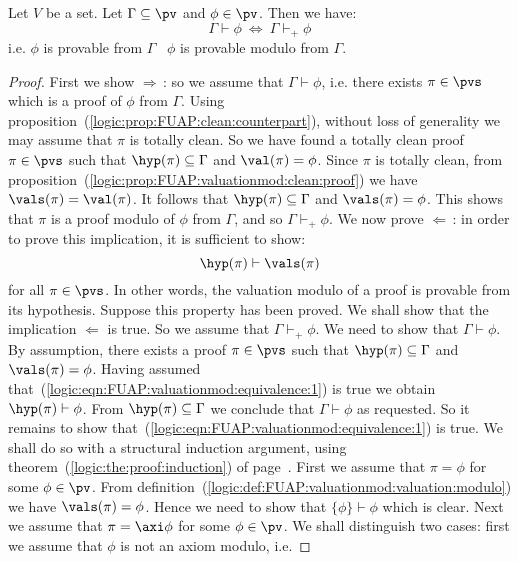 \begin{prop}\label{logic:prop:FUAP:valuationmod:equivalence}
Let $V$ be a set. Let $\Gamma\subseteq\pv$ and $\phi\in\pv$. Then we
have:
    \[
    \Gamma\vdash\phi\ \Leftrightarrow\ \Gamma\vdash_{+}\phi
    \]
i.e. $\phi$ is provable from $\Gamma$ \ifand\ $\phi$ is provable
modulo from $\Gamma$.
\end{prop}
\begin{proof}
First we show $\Rightarrow$\,: so we assume that $\Gamma\vdash\phi$,
i.e. there exists $\pi\in\pvs$ which is a proof of $\phi$ from
$\Gamma$. Using
proposition~(\ref{logic:prop:FUAP:clean:counterpart}), without loss
of generality we may assume that $\pi$ is totally clean. So we have
found a totally clean proof $\pi\in\pvs$ such that
$\hyp(\pi)\subseteq\Gamma$ and $\val(\pi)=\phi$. Since $\pi$ is
totally clean, from
proposition~(\ref{logic:prop:FUAP:valuationmod:clean:proof}) we have
$\vals(\pi)=\val(\pi)$. It follows that $\hyp(\pi)\subseteq\Gamma$
and $\vals(\pi)=\phi$. This shows that $\pi$ is a proof modulo of
$\phi$ from $\Gamma$, and so $\Gamma\vdash_{+}\phi$. We now prove
$\Leftarrow$\,: in order to prove this implication, it is sufficient
to show:
    \begin{equation}\label{logic:eqn:FUAP:valuationmod:equivalence:1}
    \hyp(\pi)\vdash\vals(\pi)
    \end{equation}
for all $\pi\in\pvs$. In other words, the valuation modulo of a
proof is provable from its hypothesis. Suppose this property has
been proved. We shall show that the implication $\Leftarrow$ is
true. So we assume that $\Gamma\vdash_{+}\phi$. We need to show that
$\Gamma\vdash\phi$. By assumption, there exists a proof $\pi\in\pvs$
such that $\hyp(\pi)\subseteq\Gamma$ and $\vals(\pi)=\phi$. Having
assumed that~(\ref{logic:eqn:FUAP:valuationmod:equivalence:1}) is
true we obtain $\hyp(\pi)\vdash\phi$. From
$\hyp(\pi)\subseteq\Gamma$ we conclude that $\Gamma\vdash\phi$ as
requested. So it remains to show
that~(\ref{logic:eqn:FUAP:valuationmod:equivalence:1}) is true. We
shall do so with a structural induction argument, using
theorem~(\ref{logic:the:proof:induction}) of
page~\pageref{logic:the:proof:induction}. First we assume that
$\pi=\phi$ for some $\phi\in\pv$. From
definition~(\ref{logic:def:FUAP:valuationmod:valuation:modulo}) we
have $\vals(\pi)=\phi$. Hence we need to show that
$\{\phi\}\vdash\phi$ which is clear. Next we assume that
$\pi=\axi\phi$ for some $\phi\in\pv$. We shall distinguish two
cases: first we assume that $\phi$ is not an axiom modulo, i.e.

\end{proof}
